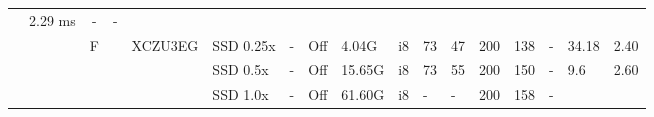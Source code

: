 \documentclass{article}
\begin{document}
\begin{table}
\begin{adjustbox}{totalheight=\baselineskip,}
\begin{tabular}{ccccclp{2em}cp{3em}cp{2em}p{4em}p{3em}p{3.5em}p{3.5em}p{2.5em}p{3em}}
                                                       &\multirow{1}{*}{2.29 ms}
                                                           &\multirow{1}{*}{-}
                                                               &\multirow{1}{*}{-}\\
\cmidrule{3-17}
   &   &\multirow{3}{*}{F}
           &\multirow{3}{*}{\cite{suhAlgorithmHardwareCoOptimizationEnergyEfficient2021}}
               &\multirow{3}{*}{XCZU3EG}
                   &\multirow{1}{*}{SSD 0.25x}
                       &\multirow{1}{*}{-}
                           &\multirow{1}{*}{Off}
                               &\multirow{1}{*}{4.04G}
                                   &\multirow{1}{*}{i8}
                                       &\multirow{1}{*}{73}
                                           &\multirow{1}{*}{47}
                                               &\multirow{1}{*}{200}
                                                   &\multirow{1}{*}{138}
                                                       &\multirow{1}{*}{-}
                                                           &\multirow{1}{*}{34.18}
                                                               &\multirow{1}{*}{2.40}\\
   &   &   &   &   &\multirow{1}{*}{SSD 0.5x}
                       &\multirow{1}{*}{-}
                           &\multirow{1}{*}{Off}
                               &\multirow{1}{*}{15.65G}
                                   &\multirow{1}{*}{i8}
                                       &\multirow{1}{*}{73}
                                           &\multirow{1}{*}{55}
                                               &\multirow{1}{*}{200}
                                                   &\multirow{1}{*}{150}
                                                       &\multirow{1}{*}{-}
                                                           &\multirow{1}{*}{9.6}
                                                               &\multirow{1}{*}{2.60}\\
   &   &   &   &   &\multirow{1}{*}{SSD 1.0x}
                       &\multirow{1}{*}{-}
                           &\multirow{1}{*}{Off}
                               &\multirow{1}{*}{61.60G}
                                   &\multirow{1}{*}{i8}
                                       &\multirow{1}{*}{-}
                                           &\multirow{1}{*}{-}
                                               &\multirow{1}{*}{200}
                                                   &\multirow{1}{*}{158}
                                                       &\multirow{1}{*}{-}

\end{tabular}
\end{adjustbox}
\end{table}
\end{document}
